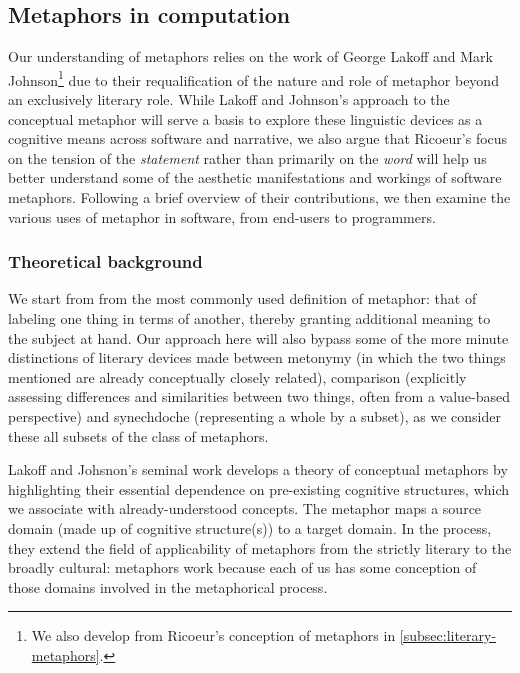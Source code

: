\subsection{Metaphors in computation}
\label{subsec:metaphor-computation}

Our understanding of metaphors relies on the work of George Lakoff and Mark Johnson\footnote{We also develop from Ricoeur's conception of metaphors in \ref{subsec:literary-metaphors}.} due to their requalification of the nature and role of metaphor beyond an exclusively literary role. While Lakoff and Johnson's approach to the conceptual metaphor will serve a basis to explore these linguistic devices as a cognitive means across software and narrative, we also argue that Ricoeur's focus on the tension of the \emph{statement} rather than primarily on the \emph{word} will help us better understand some of the aesthetic manifestations and workings of software metaphors. Following a brief overview of their contributions, we then examine the various uses of metaphor in software, from end-users to programmers.

\subsubsection{Theoretical background}
\label{subsubsec:metaphors-background}

We start from from the most commonly used definition of metaphor: that of labeling one thing in terms of another, thereby granting additional meaning to the subject at hand. Our approach here will also bypass some of the more minute distinctions of literary devices made between metonymy (in which the two things mentioned are already conceptually closely related), comparison (explicitly assessing differences and similarities between two things, often from a value-based perspective) and synechdoche (representing a whole by a subset), as we consider these all subsets of the class of metaphors.

Lakoff and Johsnon's seminal work develops a theory of conceptual metaphors by highlighting their essential dependence on pre-existing cognitive structures, which we associate with already-understood concepts. The metaphor maps a source domain (made up of cognitive structure(s)) to a target domain. In the process, they extend the field of applicability of metaphors from the strictly literary to the broadly cultural: metaphors work because each of us has some conception of those domains involved in the metaphorical process.

